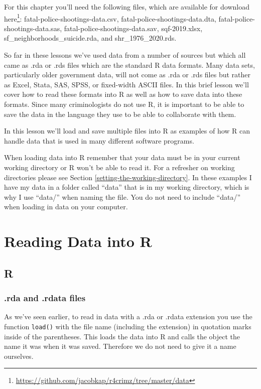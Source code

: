 \documentclass[
]{krantz}
\renewcommand{\href}[2]{#2\footnote{\url{#1}}}
\begin{document}
For this chapter you'll need the following files, which are
available for download
\href{https://github.com/jacobkap/r4crimz/tree/master/data}{here}:
fatal-police-shootings-data.csv,
fatal-police-shootings-data.dta,
fatal-police-shootings-data.sas,
fatal-police-shootings-data.sav, sqf-2019.xlsx,
sf\_neighborhoods\_suicide.rda, and shr\_1976\_2020.rds.

So far in these lessons we've used data from a number of
sources but which all came as .rda or .rds files which are
the standard R data formats. Many data sets, particularly
older government data, will not come as .rda or .rds files
but rather as Excel, Stata, SAS, SPSS, or fixed-width ASCII
files. In this brief lesson we'll cover how to read these
formats into R as well as how to save data into these
formats. Since many criminologists do not use R, it is
important to be able to save the data in the language they
use to be able to collaborate with them.

In this lesson we'll load and save multiple files into R as
examples of how R can handle data that is used in many
different software programs.

When loading data into R remember that your data must be in
your current working directory or R won't be able to read
it. For a refresher on working directories please see
Section \ref{setting-the-working-directory}. In these
examples I have my data in a folder called ``data'' that is
in my working directory, which is why I use ``data/'' when
naming the file. You do not need to include ``data/'' when
loading in data on your computer.

\hypertarget{reading-data-into-r-1}{%
\section{Reading Data into R}\label{reading-data-into-r-1}}

\hypertarget{r}{%
\subsection{R}\label{r}}

\hypertarget{rda-and-.rdata-files}{%
\subsubsection{.rda and .rdata
files}\label{rda-and-.rdata-files}}

As we've seen earlier, to read in data with a .rda or .rdata
extension you use the function \texttt{load()} with the file
name (including the extension) in quotation marks inside of
the parentheses. This loads the data into R and calls the
object the name it was when it was saved. Therefore we do
not need to give it a name ourselves.
\end{document}
